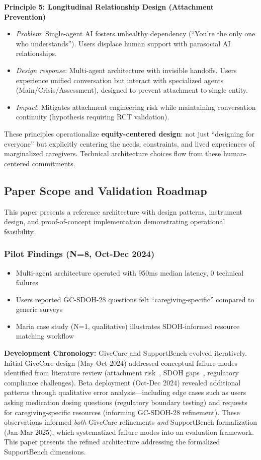 \documentclass{article}
\begin{document}
\textbf{Principle 5: Longitudinal Relationship Design (Attachment Prevention)}
\begin{itemize}
    \item \textit{Problem}: Single-agent AI fosters unhealthy dependency (``You're the only one who understands''). Users displace human support with parasocial AI relationships.
    \item \textit{Design response}: Multi-agent architecture with invisible handoffs. Users experience unified conversation but interact with specialized agents (Main/Crisis/Assessment), designed to prevent attachment to single entity.
    \item \textit{Impact}: Mitigates attachment engineering risk while maintaining conversation continuity (hypothesis requiring RCT validation).
\end{itemize}

These principles operationalize \textbf{equity-centered design}: not just ``designing for everyone'' but explicitly centering the needs, constraints, and lived experiences of marginalized caregivers. Technical architecture choices flow from these human-centered commitments.

\subsection{Paper Scope and Validation Roadmap}

This paper presents a reference architecture with design patterns, instrument design, and proof-of-concept implementation demonstrating operational feasibility.

\subsubsection{Pilot Findings (N=8, Oct-Dec 2024)}

\begin{itemize}
    \item Multi-agent architecture operated with 950ms median latency, 0 technical failures
    \item Users reported GC-SDOH-28 questions felt ``caregiving-specific'' compared to generic surveys
    \item Maria case study (N=1, qualitative) illustrates SDOH-informed resource matching workflow
\end{itemize}

\textbf{Development Chronology:} GiveCare and SupportBench evolved iteratively. Initial GiveCare design (May-Oct 2024) addressed conceptual failure modes identified from literature review (attachment risk~\cite{replika2024}, SDOH gaps~\cite{aarp2025}, regulatory compliance challenges). Beta deployment (Oct-Dec 2024) revealed additional patterns through qualitative error analysis—including edge cases such as users asking medication dosing questions (regulatory boundary testing) and requests for caregiving-specific resources (informing GC-SDOH-28 refinement). These observations informed \textit{both} GiveCare refinements \textit{and} SupportBench formalization (Jan-Mar 2025), which systematized failure modes into an evaluation framework. This paper presents the refined architecture addressing the formalized SupportBench dimensions.
\end{document}
